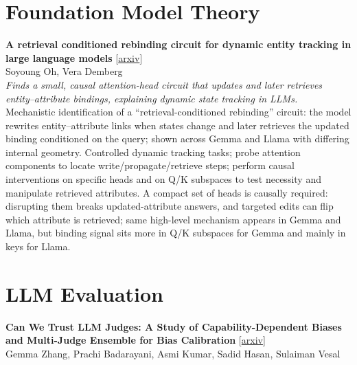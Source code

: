 \documentclass[12pt,letterpaper]{article}
\begin{document}
\medskip


\section*{Foundation Model Theory}

{\small\textbf{A retrieval conditioned rebinding circuit for dynamic entity tracking in large language models}} {\scriptsize[\href{https://arxiv.org/abs/2606.08644}{arxiv}]}\\
{\scriptsize Soyoung Oh, Vera Demberg}\\

{\small\textit{Finds a small, causal attention-head circuit that updates and later retrieves entity--attribute bindings, explaining dynamic state tracking in LLMs.}}\\[1pt]
{\footnotesize Mechanistic identification of a ``retrieval-conditioned rebinding'' circuit: the model rewrites entity--attribute links when states change and later retrieves the updated binding conditioned on the query; shown across Gemma and Llama with differing internal geometry. Controlled dynamic tracking tasks; probe attention components to locate write/propagate/retrieve steps; perform causal interventions on specific heads and on Q/K subspaces to test necessity and manipulate retrieved attributes. A compact set of heads is causally required: disrupting them breaks updated-attribute answers, and targeted edits can flip which attribute is retrieved; same high-level mechanism appears in Gemma and Llama, but binding signal sits more in Q/K subspaces for Gemma and mainly in keys for Llama.}

\medskip


\section*{LLM Evaluation}

{\small\textbf{Can We Trust LLM Judges: A Study of Capability-Dependent Biases and Multi-Judge Ensemble for Bias Calibration}} {\scriptsize[\href{https://arxiv.org/abs/2609.12002}{arxiv}]}\\
{\scriptsize Gemma Zhang, Prachi Badarayani, Asmi Kumar, Sadid Hasan, Sulaiman Vesal}\\
\end{document}
